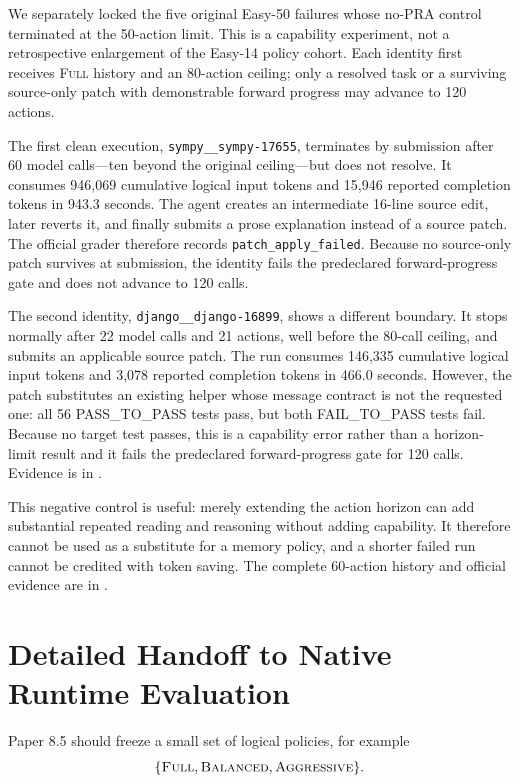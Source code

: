 \documentclass[11pt]{article}
\begin{document}
We separately locked the five original Easy-50 failures whose no-PRA control
terminated at the 50-action limit.  This is a capability experiment, not a
retrospective enlargement of the Easy-14 policy cohort.  Each identity first
receives \textsc{Full} history and an 80-action ceiling; only a resolved task or
a surviving source-only patch with demonstrable forward progress may advance
to 120 actions.

The first clean execution, \texttt{sympy\_\_sympy-17655}, terminates by
submission after 60 model calls---ten beyond the original ceiling---but does
not resolve.  It consumes 946,069 cumulative logical input tokens and 15,946
reported completion tokens in 943.3 seconds.  The agent creates an intermediate
16-line source edit, later reverts it, and finally submits a prose explanation
instead of a source patch.  The official grader therefore records
\texttt{patch\_apply\_failed}.  Because no source-only patch survives at
submission, the identity fails the predeclared forward-progress gate and does
not advance to 120 calls.

The second identity, \texttt{django\_\_django-16899}, shows a different
boundary.  It stops normally after 22 model calls and 21 actions, well before
the 80-call ceiling, and submits an applicable source patch.  The run consumes
146,335 cumulative logical input tokens and 3,078 reported completion tokens
in 466.0 seconds.  However, the patch substitutes an existing helper whose
message contract is not the requested one: all 56 PASS\_TO\_PASS tests pass,
but both FAIL\_TO\_PASS tests fail.  Because no target test passes, this is a
capability error rather than a horizon-limit result and it fails the
predeclared forward-progress gate for 120 calls.  Evidence is in
.

This negative control is useful: merely extending the action horizon can add
substantial repeated reading and reasoning without adding capability.  It
therefore cannot be used as a substitute for a memory policy, and a shorter
failed run cannot be credited with token saving.  The complete 60-action
history and official evidence are in
.

\section{Detailed Handoff to Native Runtime Evaluation}

Paper 8.5 should freeze a small set of logical policies, for example
\[
\{\textsc{Full},\textsc{Balanced},\textsc{Aggressive}\}.
\]
\end{document}
